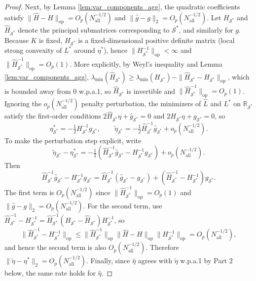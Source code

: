 \documentclass{article}
\begin{document}
\begin{proof}
Next, by Lemma \ref{lem:var_components_agg}, the quadratic coefficients satisfy $\|\widehat{H}-H\|_{\mathrm{op}}=O_p(N_{\mathrm{all}}^{-1/2})$ and $\|\widehat{g}-g\|_2=O_p(N_{\mathrm{all}}^{-1/2})$.
Let $H_{\mathcal{S}^*}$ and $\widehat{H}_{\mathcal{S}^*}$ denote the principal submatrices corresponding to $\mathcal{S}^*$, and similarly for $g$.
Because $K$ is fixed, $H_{\mathcal{S}^*}$ is a fixed-dimensional positive definite matrix (local strong convexity of $L^*$ around $\eta^*$), hence $\|H_{\mathcal{S}^*}^{-1}\|_{\mathrm{op}}<\infty$ and $\|\widehat{H}_{\mathcal{S}^*}^{-1}\|_{\mathrm{op}}=O_p(1)$.
More explicitly, by Weyl's inequality and Lemma \ref{lem:var_components_agg}, $\lambda_{\min}(\widehat{H}_{\mathcal{S}^*})\ge \lambda_{\min}(H_{\mathcal{S}^*}) - \|\widehat{H}_{\mathcal{S}^*}-H_{\mathcal{S}^*}\|_{\mathrm{op}}$, which is bounded away from 0 w.p.a.1, so $\widehat{H}_{\mathcal{S}^*}$ is invertible and $\|\widehat{H}_{\mathcal{S}^*}^{-1}\|_{\mathrm{op}}=O_p(1)$.
Ignoring the $o_p(N_{\mathrm{all}}^{-1/2})$ penalty perturbation, the minimizers of $\widehat{L}$ and $L^*$ on $\mathbb{R}_{\mathcal{S}^*}$ satisfy the first-order conditions
$2\widehat{H}_{\mathcal{S}^*}\eta + \widehat{g}_{\mathcal{S}^*}=0$ and $2H_{\mathcal{S}^*}\eta + g_{\mathcal{S}^*}=0$,
so
\[
\eta^*_{\mathcal{S}^*} = -\tfrac{1}{2}H_{\mathcal{S}^*}^{-1}g_{\mathcal{S}^*},
\qquad
\widetilde{\eta}_{\mathcal{S}^*} = -\tfrac{1}{2}\widehat{H}_{\mathcal{S}^*}^{-1}\widehat{g}_{\mathcal{S}^*} + o_p(N_{\mathrm{all}}^{-1/2}).
\]
To make the perturbation step explicit, write
\[
\widetilde{\eta}_{\mathcal{S}^*}-\eta^*_{\mathcal{S}^*}
=
-\tfrac{1}{2}\left(\widehat{H}_{\mathcal{S}^*}^{-1}\widehat{g}_{\mathcal{S}^*}-H_{\mathcal{S}^*}^{-1}g_{\mathcal{S}^*}\right)
+o_p(N_{\mathrm{all}}^{-1/2}).
\]
Then
\[
\widehat{H}_{\mathcal{S}^*}^{-1}\widehat{g}_{\mathcal{S}^*}-H_{\mathcal{S}^*}^{-1}g_{\mathcal{S}^*}
=
\widehat{H}_{\mathcal{S}^*}^{-1}(\widehat{g}_{\mathcal{S}^*}-g_{\mathcal{S}^*})
+(\widehat{H}_{\mathcal{S}^*}^{-1}-H_{\mathcal{S}^*}^{-1})g_{\mathcal{S}^*}.
\]
The first term is $O_p(N_{\mathrm{all}}^{-1/2})$ since $\|\widehat{H}_{\mathcal{S}^*}^{-1}\|_{\mathrm{op}}=O_p(1)$ and $\|\widehat{g}-g\|_2=O_p(N_{\mathrm{all}}^{-1/2})$.
For the second term, use $\widehat{H}_{\mathcal{S}^*}^{-1}-H_{\mathcal{S}^*}^{-1}=\widehat{H}_{\mathcal{S}^*}^{-1}(H_{\mathcal{S}^*}-\widehat{H}_{\mathcal{S}^*})H_{\mathcal{S}^*}^{-1}$, so
\[
\|\widehat{H}_{\mathcal{S}^*}^{-1}-H_{\mathcal{S}^*}^{-1}\|_{\mathrm{op}}
\le
\|\widehat{H}_{\mathcal{S}^*}^{-1}\|_{\mathrm{op}}\|\widehat{H}-H\|_{\mathrm{op}}\|H_{\mathcal{S}^*}^{-1}\|_{\mathrm{op}}
=
O_p(N_{\mathrm{all}}^{-1/2}),
\]
and hence the second term is also $O_p(N_{\mathrm{all}}^{-1/2})$. Therefore $\|\widetilde{\eta}-\eta^*\|_2 = O_p(N_{\mathrm{all}}^{-1/2})$.
Finally, since $\widehat{\eta}$ agrees with $\widetilde{\eta}$ w.p.a.1 by Part 2 below, the same rate holds for $\widehat{\eta}$.


\end{proof}
\end{document}
